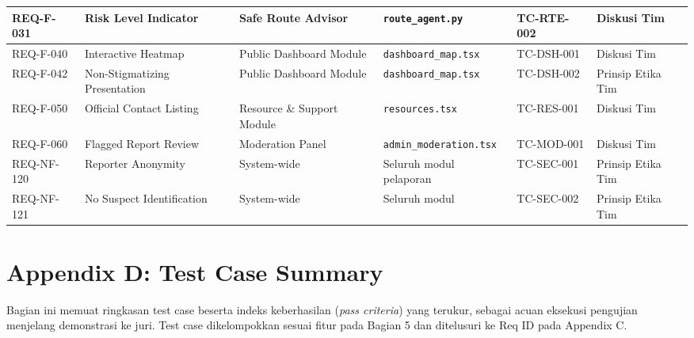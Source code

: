 \documentclass[11pt,a4paper]{article}
\begin{document}
\begin{longtable}{|L{1.7cm}|L{2.6cm}|L{2.3cm}|L{2.6cm}|L{1.7cm}|L{2.0cm}|}
REQ-F-031 & Risk Level Indicator & Safe Route Advisor & \texttt{route\_agent.py} & TC-RTE-002 & Diskusi Tim \\ \hline
REQ-F-040 & Interactive Heatmap & Public Dashboard Module & \texttt{dashboard\_map.tsx} & TC-DSH-001 & Diskusi Tim \\ \hline
REQ-F-042 & Non-Stigmatizing Presentation & Public Dashboard Module & \texttt{dashboard\_map.tsx} & TC-DSH-002 & Prinsip Etika Tim \\ \hline
REQ-F-050 & Official Contact Listing & Resource \& Support Module & \texttt{resources.tsx} & TC-RES-001 & Diskusi Tim \\ \hline
REQ-F-060 & Flagged Report Review & Moderation Panel & \texttt{admin\_moderation.tsx} & TC-MOD-001 & Diskusi Tim \\ \hline
REQ-NF-120 & Reporter Anonymity & System-wide & Seluruh modul pelaporan & TC-SEC-001 & Prinsip Etika Tim \\ \hline
REQ-NF-121 & No Suspect Identification & System-wide & Seluruh modul & TC-SEC-002 & Prinsip Etika Tim \\ \hline
\end{longtable}
\normalsize

\newpage

\section*{Appendix D: Test Case Summary}

Bagian ini memuat ringkasan test case beserta indeks keberhasilan (\textit{pass criteria}) yang terukur, sebagai acuan eksekusi pengujian menjelang demonstrasi ke juri. Test case dikelompokkan sesuai fitur pada Bagian 5 dan ditelusuri ke Req ID pada Appendix C.
\end{document}
